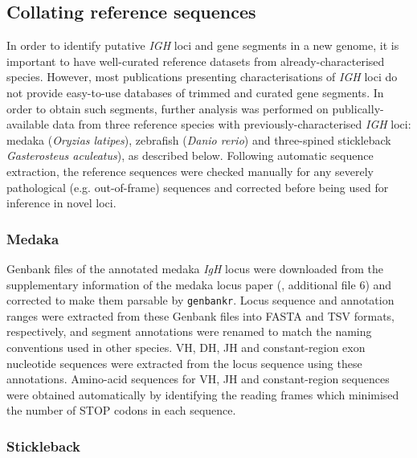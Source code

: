 \subsection{Collating reference sequences}

In order to identify putative \textit{IGH} loci and gene segments in a new genome, it is important to have well-curated reference datasets from already-characterised species. However, most publications presenting characterisations of \textit{IGH} loci do not provide easy-to-use databases of trimmed and curated gene segments. In order to obtain such segments, further analysis was performed on publically-available data from three reference species with previously-characterised \textit{IGH} loci: medaka (\textit{Oryzias latipes}), zebrafish (\textit{Danio rerio}) and three-spined stickleback \textit{Gasterosteus aculeatus}), as described below. Following automatic sequence extraction, the reference sequences were checked manually for any severely pathological (e.g. out-of-frame) sequences and corrected before being used for inference in novel loci.

\subsubsection{Medaka}
\label{sec:ref_locus_ola}

Genbank files of the annotated medaka \textit{IgH} locus were downloaded from the supplementary information of the medaka locus paper (\citep{magadan2011medaka}, additional file 6) and corrected to make them parsable by \texttt{genbankr}. Locus sequence and annotation ranges were extracted from these Genbank files into FASTA and TSV formats, respectively, and segment annotations were renamed to match the naming conventions used in other species. VH, DH, JH and constant-region exon nucleotide sequences were extracted from the locus sequence using these annotations. Amino-acid sequences for VH, JH and constant-region sequences were obtained automatically by identifying the reading frames which minimised the number of STOP codons in each sequence.

\subsubsection{Stickleback}
\label{sec:ref_locus_gac}

